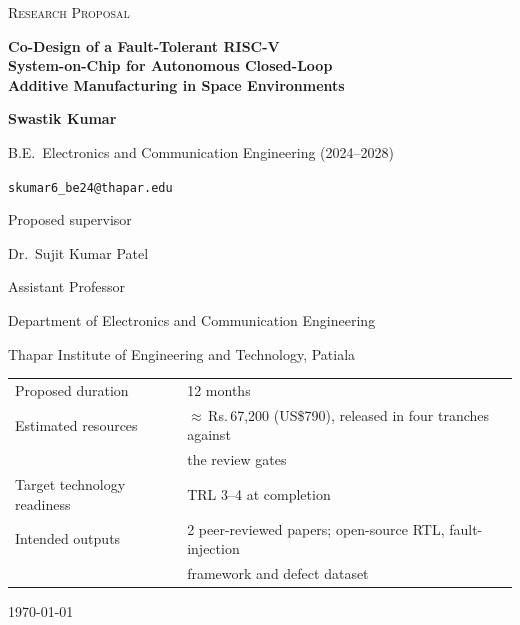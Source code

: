 \documentclass[11pt,a4paper]{article}
\newcommand{\rupee}{\textrm{Rs.}}
\begin{document}

\begin{titlepage}
\centering
\vspace*{1.5cm}

{\Large\scshape Research Proposal\par}
\vspace{1.2cm}

{\LARGE\bfseries Co-Design of a Fault-Tolerant RISC-V\\[0.35em]
System-on-Chip for Autonomous Closed-Loop\\[0.35em]
Additive Manufacturing in Space Environments\par}

\vspace{1.8cm}

{\large\bfseries Swastik Kumar\par}
\vspace{0.3em}
{\normalsize B.E.\ Electronics and Communication Engineering (2024--2028)\par}
{\normalsize \texttt{skumar6\_be24@thapar.edu}\par}

\vspace{1.4cm}

{\normalsize Proposed supervisor\par}
{\large Dr.\ Sujit Kumar Patel\par}
{\normalsize Assistant Professor\par}
\vspace{0.4em}
{\normalsize Department of Electronics and Communication Engineering\par}
{\normalsize Thapar Institute of Engineering and Technology, Patiala\par}

\vfill

\begin{tabular}{@{}ll@{}}
\toprule
Proposed duration           & 12 months \\
Estimated resources         & \(\approx\)\,\rupee\,67{,}200
                                (US\$790), released in four tranches against\\
                            & the review gates \\
Target technology readiness & TRL 3--4 at completion \\
Intended outputs            & 2 peer-reviewed papers; open-source RTL,
                              fault-injection\\
                            & framework and defect dataset \\
\bottomrule
\end{tabular}

\vspace{1cm}
{\normalsize \today\par}
\end{titlepage}
\end{document}
